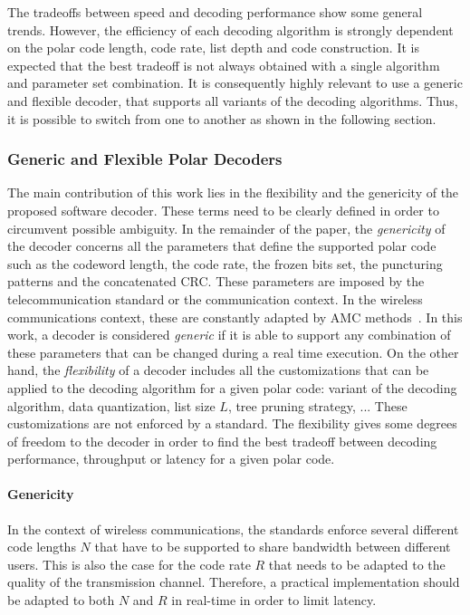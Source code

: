 The tradeoffs between speed and decoding performance show some general trends.
However, the efficiency of each decoding algorithm is strongly dependent on the
polar code length, code rate, list depth and code construction. It is expected
that the best tradeoff is not always obtained with a single algorithm and
parameter set combination. It is consequently highly relevant to use a generic
and flexible decoder, that supports all variants of the decoding algorithms.
Thus, it is possible to switch from one to another as shown in the following
section.

\subsubsection{Generic and Flexible Polar Decoders}
\label{sec:genericity}

The main contribution of this work lies in the flexibility and the genericity of
the proposed software decoder. These terms need to be clearly defined in order
to circumvent possible ambiguity. In the remainder of the paper, the
\textit{genericity} of the decoder concerns all the parameters that define the
supported polar code such as the codeword length, the code rate, the frozen bits
set, the puncturing patterns and the concatenated CRC. These parameters are
imposed by the telecommunication standard or the communication context. In the
wireless communications context, these are constantly adapted by AMC
methods~\cite{Dahlman2013}. In this work, a decoder is considered
\textit{generic} if it is able to support any combination of these parameters
that can be changed during a real time execution. On the other hand, the
\textit{flexibility} of a decoder includes all the customizations that can be
applied to the decoding algorithm for a given polar code: variant of the
decoding algorithm, data quantization, list size $L$, tree pruning strategy, ...
These customizations are not enforced by a standard. The flexibility gives some
degrees of freedom to the decoder in order to find the best tradeoff between
decoding performance, throughput or latency for a given polar code.

\paragraph{Genericity}

In the context of wireless communications, the standards enforce several
different code lengths $N$ that have to be supported to share bandwidth between
different users. This is also the case for the code rate $R$ that needs to be
adapted to the quality of the transmission channel. Therefore, a practical
implementation should be adapted to both $N$ and $R$ in real-time in order to
limit latency.

